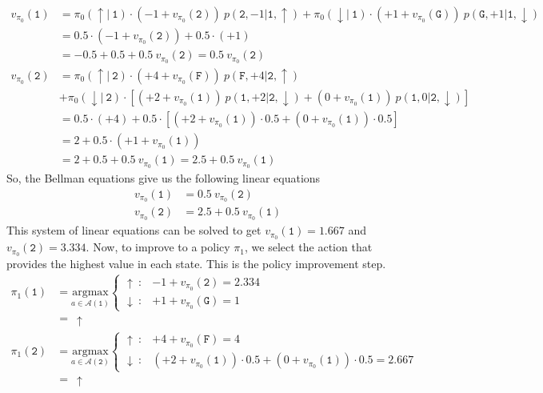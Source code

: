 \documentclass[11pt]{article}
\begin{document}
    \begin{align*}
        v_{\pi_{0}}(\texttt{1}) &= \pi_{0}(\uparrow | \ \texttt{1}) \cdot ( -1 + v_{\pi_{0}}(\texttt{2}) ) \ p(\texttt{2}, -1 | \texttt{1}, \uparrow)
        + \pi_{0}(\downarrow | \ \texttt{1}) \cdot ( +1 + v_{\pi_{0}}(\texttt{G}) ) \ p(\texttt{G}, +1 | \texttt{1}, \downarrow) \\
        &= 0.5 \cdot ( -1 + v_{\pi_{0}}(\texttt{2}) ) + 0.5 \cdot ( +1  ) \\
        &= -0.5 + 0.5 + 0.5 \ v_{\pi_{0}}(\texttt{2}) = 0.5 \ v_{\pi_{0}}(\texttt{2}) \\
        v_{\pi_{0}}(\texttt{2}) &= \pi_{0}(\uparrow | \ \texttt{2}) \cdot ( +4 + v_{\pi_{0}}(\texttt{F}) ) \ p(\texttt{F}, +4 | \texttt{2}, \uparrow) \\
        &+ \pi_{0}(\downarrow | \ \texttt{2}) \cdot [ ( +2 + v_{\pi_{0}}(\texttt{1}) ) \ p(\texttt{1}, +2 | \texttt{2}, \downarrow) +
        ( 0 + v_{\pi_{0}}(\texttt{1}) ) \ p(\texttt{1}, 0 | \texttt{2}, \downarrow) ] \\
        &= 0.5 \cdot ( +4 ) + 0.5 \cdot [ ( +2 + v_{\pi_{0}}(\texttt{1}) ) \cdot 0.5 + ( 0 + v_{\pi_{0}}(\texttt{1}) ) \cdot 0.5 ] \\
        &= 2 + 0.5 \cdot ( +1 + v_{\pi_{0}}(\texttt{1}) ) \\
        &= 2 + 0.5 + 0.5 \ v_{\pi_{0}}(\texttt{1}) = 2.5 + 0.5 \ v_{\pi_{0}}(\texttt{1})
    \end{align*}
    So, the Bellman equations give us the following linear equations
    \begin{align*}
        v_{\pi_{0}}(\texttt{1}) &= 0.5 \ v_{\pi_{0}}(\texttt{2}) \\
        v_{\pi_{0}}(\texttt{2}) &= 2.5 + 0.5 \ v_{\pi_{0}}(\texttt{1})
    \end{align*}
    This system of linear equations can be solved to get $v_{\pi_{0}}(\texttt{1}) = 1.667$ and $v_{\pi_{0}}(\texttt{2}) = 3.334$.
    Now, to improve to a policy $\pi_{1}$, we select the action that provides the highest value in each state.
    This is the policy improvement step.
    \begin{align*}
        \pi_{1}(\texttt{1}) &= \underset{a \in \mathcal{A}(\texttt{1})}{\mathrm{argmax}} \begin{cases}
            \uparrow \ : & -1 + v_{\pi_{0}}(\texttt{2}) = 2.334 \\
            \downarrow \ : & +1 + v_{\pi_{0}}(\texttt{G}) = 1
        \end{cases} \\
        &= \ \uparrow \\
        \pi_{1}(\texttt{2}) &= \underset{a \in \mathcal{A}(\texttt{2})}{\mathrm{argmax}} \begin{cases}
            \uparrow \ : & +4 + v_{\pi_{0}}(\texttt{F}) = 4 \\
            \downarrow \ : & (+2 + v_{\pi_{0}}(\texttt{1})) \cdot 0.5 + (0 + v_{\pi_{0}}(\texttt{1})) \cdot 0.5 = 2.667
        \end{cases} \\
        &= \ \uparrow
    \end{align*}
\end{document}
